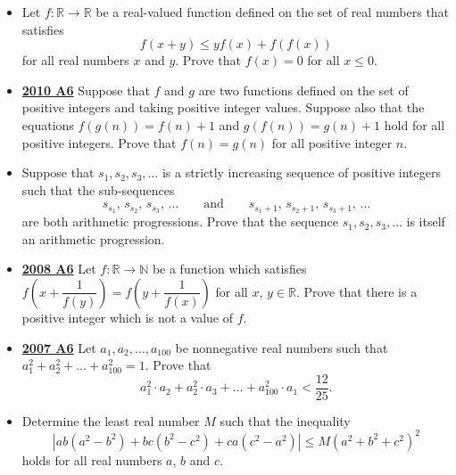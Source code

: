 \documentclass[11pt]{scrartcl}
\begin{document}
\begin{itemize}[leftmargin=*]
Prove that the sequence $k_1,k_2,\dots $ is unbounded.
\item {}	Let $f : \mathbb R \to \mathbb R$ be a real-valued function defined on the set of real numbers that satisfies
\[f(x + y) \leqslant yf(x) + f(f(x))\]
for all real numbers $x$ and $y$. Prove that $f(x) = 0$ for all $x \leqslant 0$. 
\item \href{https://artofproblemsolving.com/community/c6h418683p2362289}{\textbf{2010 A6}} Suppose that $f$ and $g$ are two functions defined on the set of positive integers and taking positive integer values. Suppose also that the equations $f(g(n)) = f(n) + 1$ and $g(f(n)) = g(n) + 1$ hold for all positive integers. Prove that $f(n) = g(n)$ for all positive integer $n.$ 
\item {} Suppose that $ s_1,s_2,s_3, \dots$ is a strictly increasing sequence of positive integers such that the sub-sequences\[s_{s_1},\, s_{s_2},\, s_{s_3},\, \dots\qquad\text{and}\qquad s_{s_1+1},\, s_{s_2+1},\, s_{s_3+1},\, \dots\]are both arithmetic progressions. Prove that the sequence $ s_1, s_2, s_3, \dots$ is itself an arithmetic progression. 	
\item \href{https://artofproblemsolving.com/community/c6h287857p1555902}{\textbf{2008 A6}} 	Let $ f: \mathbb{R}\to\mathbb{N}$ be a function which satisfies $ f\left(x + \dfrac{1}{f(y)}\right) = f\left(y + \dfrac{1}{f(x)}\right)$ for all $ x$, $ y\in\mathbb{R}$. Prove that there is a positive integer which is not a value of $ f$. 
\item \href{https://artofproblemsolving.com/community/c6h214705p1187171}{\textbf{2007 A6}} Let $ a_1, a_2, \dots, a_{100}$ be nonnegative real numbers such that $ a^2_1 + a^2_2 + \dots + a^2_{100} = 1.$ Prove that
\[ a^2_1 \cdot a_2 + a^2_2 \cdot a_3 + \dots + a^2_{100} \cdot a_1 < \frac {12}{25}.
\] 
\item {} Determine the least real number $M$ such that the inequality\[|ab(a^{2}-b^{2})+bc(b^{2}-c^{2})+ca(c^{2}-a^{2})| \leqslant M(a^{2}+b^{2}+c^{2})^{2}\]holds for all real numbers $a$, $b$ and $c$.
\end{itemize}


 
\newpage
\end{document}
